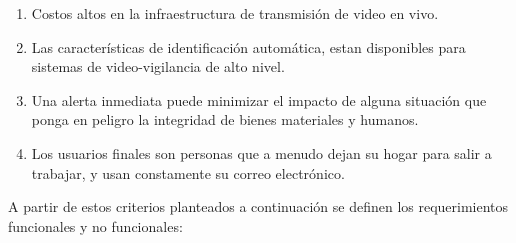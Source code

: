 \begin{enumerate}
    \item Costos altos en la infraestructura de transmisión de video en vivo.
    \item Las características de identificación automática, estan disponibles para sistemas de video-vigilancia de alto nivel.
    \item Una alerta inmediata puede minimizar el impacto de alguna situación que ponga en peligro la integridad de bienes materiales y humanos.
    \item Los usuarios finales son personas que a menudo dejan su hogar para salir a trabajar, y usan constamente su correo electrónico.
\end{enumerate}

A partir de estos criterios planteados a continuación se definen los requerimientos funcionales y no funcionales:

